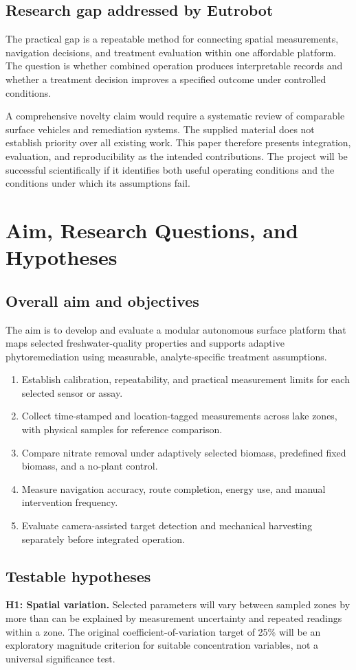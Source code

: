 \documentclass[12pt,a4paper]{article}
\newcommand{\papersection}[1]{\clearpage\section{#1}}
\begin{document}
\subsection{Research gap addressed by Eutrobot}
The practical gap is a repeatable method for connecting spatial measurements, navigation decisions, and treatment evaluation within one affordable platform. The question is whether combined operation produces interpretable records and whether a treatment decision improves a specified outcome under controlled conditions.

A comprehensive novelty claim would require a systematic review of comparable surface vehicles and remediation systems. The supplied material does not establish priority over all existing work. This paper therefore presents integration, evaluation, and reproducibility as the intended contributions. The project will be successful scientifically if it identifies both useful operating conditions and the conditions under which its assumptions fail.

\papersection{Aim, Research Questions, and Hypotheses}
\subsection{Overall aim and objectives}
The aim is to develop and evaluate a modular autonomous surface platform that maps selected freshwater-quality properties and supports adaptive phytoremediation using measurable, analyte-specific treatment assumptions.
\begin{enumerate}
\item Establish calibration, repeatability, and practical measurement limits for each selected sensor or assay.
\item Collect time-stamped and location-tagged measurements across lake zones, with physical samples for reference comparison.
\item Compare nitrate removal under adaptively selected biomass, predefined fixed biomass, and a no-plant control.
\item Measure navigation accuracy, route completion, energy use, and manual intervention frequency.
\item Evaluate camera-assisted target detection and mechanical harvesting separately before integrated operation.
\end{enumerate}

\subsection{Testable hypotheses}
\textbf{H1: Spatial variation.} Selected parameters will vary between sampled zones by more than can be explained by measurement uncertainty and repeated readings within a zone. The original coefficient-of-variation target of 25\% will be an exploratory magnitude criterion for suitable concentration variables, not a universal significance test.
\end{document}
